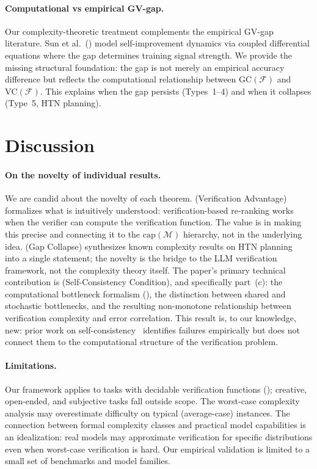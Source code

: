\documentclass{article}
\theoremstyle{definition}
\theoremstyle{remark}
\newcommand{\VC}{\mathrm{VC}}           %
\newcommand{\GC}{\mathrm{GC}}           %
\newcommand{\calM}{\mathcal{M}}         %
\newcommand{\calF}{\mathcal{F}}         %
\begin{document}
\paragraph{Computational vs empirical GV-gap.}
Our complexity-theoretic treatment complements the empirical GV-gap literature. Sun et al.~(\citeyear{sun2025solver}) model self-improvement dynamics via coupled differential equations where the gap determines training signal strength. We provide the missing structural foundation: the gap is not merely an empirical accuracy difference but reflects the computational relationship between $\GC(\calF)$ and $\VC(\calF)$. This explains when the gap persists (Types~1--4) and when it collapses (Type~5, HTN planning).

\section{Discussion}
\label{sec:discussion}

\paragraph{On the novelty of individual results.}
We are candid about the novelty of each theorem.
 (Verification Advantage) formalizes what is intuitively understood: verification-based re-ranking works when the verifier can compute the verification function. The value is in making this precise and connecting it to the $\mathrm{cap}(\calM)$ hierarchy, not in the underlying idea.
 (Gap Collapse) synthesizes known complexity results on HTN planning~\citep{erol1996complexity,behnke2024verification} into a single statement; the novelty is the bridge to the LLM verification framework, not the complexity theory itself.
The paper's primary technical contribution is  (Self-Consistency Condition), and specifically part~(c): the computational bottleneck formalism (), the distinction between shared and stochastic bottlenecks, and the resulting non-monotone relationship between verification complexity and error correlation.
This result is, to our knowledge, new: prior work on self-consistency~\citep{wang2023selfconsistency,tao2024selfconsistency} identifies failures empirically but does not connect them to the computational structure of the verification problem.

\paragraph{Limitations.}
Our framework applies to tasks with decidable verification functions (); creative, open-ended, and subjective tasks fall outside scope.
The worst-case complexity analysis may overestimate difficulty on typical (average-case) instances.
The connection between formal complexity classes and practical model capabilities is an idealization: real models may approximate verification for specific distributions even when worst-case verification is hard.
Our empirical validation is limited to a small set of benchmarks and model families.
\end{document}
